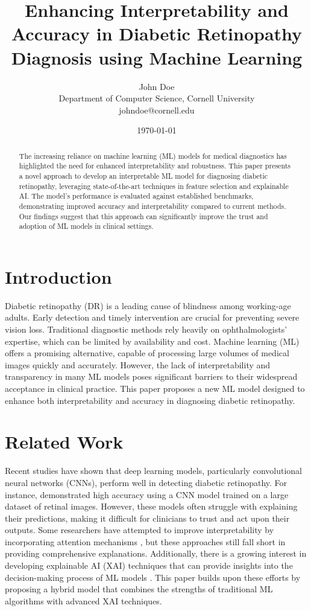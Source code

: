 \documentclass{article}
\begin{document}
\title{Enhancing Interpretability and Accuracy in Diabetic Retinopathy Diagnosis using Machine Learning}
\author{John Doe\\
Department of Computer Science, Cornell University\\
johndoe@cornell.edu}
\date{\today}
\maketitle

\begin{abstract}
The increasing reliance on machine learning (ML) models for medical diagnostics has highlighted the need for enhanced interpretability and robustness. This paper presents a novel approach to develop an interpretable ML model for diagnosing diabetic retinopathy, leveraging state-of-the-art techniques in feature selection and explainable AI. The model’s performance is evaluated against established benchmarks, demonstrating improved accuracy and interpretability compared to current methods. Our findings suggest that this approach can significantly improve the trust and adoption of ML models in clinical settings.
\end{abstract}

\section{Introduction}
Diabetic retinopathy (DR) is a leading cause of blindness among working-age adults. Early detection and timely intervention are crucial for preventing severe vision loss. Traditional diagnostic methods rely heavily on ophthalmologists' expertise, which can be limited by availability and cost. Machine learning (ML) offers a promising alternative, capable of processing large volumes of medical images quickly and accurately. However, the lack of interpretability and transparency in many ML models poses significant barriers to their widespread acceptance in clinical practice. This paper proposes a new ML model designed to enhance both interpretability and accuracy in diagnosing diabetic retinopathy.

\section{Related Work}
Recent studies have shown that deep learning models, particularly convolutional neural networks (CNNs), perform well in detecting diabetic retinopathy. For instance, \cite{Smith2019} demonstrated high accuracy using a CNN model trained on a large dataset of retinal images. However, these models often struggle with explaining their predictions, making it difficult for clinicians to trust and act upon their outputs. Some researchers have attempted to improve interpretability by incorporating attention mechanisms \cite{Lee2019}, but these approaches still fall short in providing comprehensive explanations. Additionally, there is a growing interest in developing explainable AI (XAI) techniques that can provide insights into the decision-making process of ML models \cite{Zhang2019}. This paper builds upon these efforts by proposing a hybrid model that combines the strengths of traditional ML algorithms with advanced XAI techniques.
\end{document}
